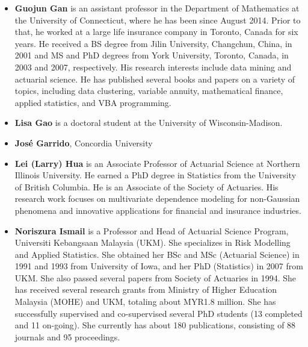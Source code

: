 \documentclass[]{book}
\providecommand{\tightlist}{%
  \setlength{\itemsep}{0pt}\setlength{\parskip}{0pt}}
\theoremstyle{definition}
\theoremstyle{definition}
\theoremstyle{definition}
\theoremstyle{remark}
\begin{document}
\begin{itemize}
\item
  \textbf{Guojun Gan} is an assistant professor in the Department of
  Mathematics at the University of Connecticut, where he has been since
  August 2014. Prior to that, he worked at a large life insurance
  company in Toronto, Canada for six years. He received a BS degree from
  Jilin University, Changchun, China, in 2001 and MS and PhD degrees
  from York University, Toronto, Canada, in 2003 and 2007, respectively.
  His research interests include data mining and actuarial science. He
  has published several books and papers on a variety of topics,
  including data clustering, variable annuity, mathematical finance,
  applied statistics, and VBA programming.
\item
  \textbf{Lisa Gao} is a doctoral student at the University of
  Wisconsin-Madison.
\item
  \textbf{José Garrido}, Concordia University
\end{itemize}

\begin{itemize}
\tightlist
\item
  \textbf{Lei (Larry) Hua} is an Associate Professor of Actuarial
  Science at Northern Illinois University. He earned a PhD degree in
  Statistics from the University of British Columbia. He is an Associate
  of the Society of Actuaries. His research work focuses on multivariate
  dependence modeling for non-Gaussian phenomena and innovative
  applications for financial and insurance industries.
\end{itemize}

\begin{itemize}
\tightlist
\item
  \textbf{Noriszura Ismail} is a Professor and Head of Actuarial Science
  Program, Universiti Kebangsaan Malaysia (UKM). She specializes in Risk
  Modelling and Applied Statistics. She obtained her BSc and MSc
  (Actuarial Science) in 1991 and 1993 from University of Iowa, and her
  PhD (Statistics) in 2007 from UKM. She also passed several papers from
  Society of Actuaries in 1994. She has received several research grants
  from Ministry of Higher Education Malaysia (MOHE) and UKM, totaling
  about MYR1.8 million. She has successfully supervised and
  co-supervised several PhD students (13 completed and 11 on-going). She
  currently has about 180 publications, consisting of 88 journals and 95
  proceedings.
\end{itemize}
\end{document}
